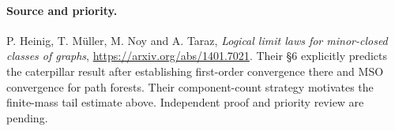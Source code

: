 \documentclass[11pt]{article}
\begin{document}
\paragraph{Source and priority.} P. Heinig, T. M\"uller, M. Noy and A. Taraz, \emph{Logical limit laws for minor-closed classes of graphs}, \url{https://arxiv.org/abs/1401.7021}. Their §6 explicitly predicts the caterpillar result after establishing first-order convergence there and MSO convergence for path forests. Their component-count strategy motivates the finite-mass tail estimate above. Independent proof and priority review are pending.
\end{document}
